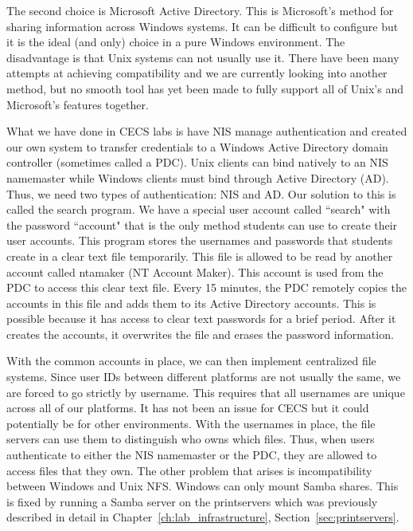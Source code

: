 The second choice is Microsoft Active Directory.  This is Microsoft's method for sharing information across Windows systems.  It can be difficult to configure but it is the ideal (and only) choice in a pure Windows environment.  The disadvantage is that Unix systems can not usually use it.  There have been many attempts at achieving compatibility and we are currently looking into another method, but no smooth tool has yet been made to fully support all of Unix's and Microsoft's features together.  

What we have done in CECS labs is have NIS manage authentication and created our own system to transfer credentials to a Windows Active Directory domain controller (sometimes called a PDC).  Unix clients can bind natively to an NIS namemaster while Windows clients must bind through Active Directory (AD).  Thus, we need two types of authentication: NIS and AD.  Our solution to this is called the search program.  We have a special user account called ``search" with the password ``account" that is the only method students can use to create their user accounts.  This program stores the usernames and passwords that students create in a clear text file temporarily.  This file is allowed to be read by another account called ntamaker (NT Account Maker).  This account is used from the PDC to access this clear text file.  Every 15 minutes, the PDC remotely copies the accounts in this file and adds them to its Active Directory accounts.  This is possible because it has access to clear text passwords for a brief period.  After it creates the accounts, it overwrites the file and erases the password information.

With the common accounts in place, we can then implement centralized file systems.  Since user IDs between different platforms are not usually the same, we are forced to go strictly by username.  This requires that all usernames are unique across all of our platforms.  It has not been an issue for CECS but it could potentially be for other environments.  With the usernames in place, the file servers can use them to distinguish who owns which files.  Thus, when users authenticate to either the NIS namemaster or the PDC, they are allowed to access files that they own.  The other problem that arises is incompatibility between Windows and Unix NFS.  Windows can only mount Samba shares.  This is fixed by running a Samba server on the printservers which was previously described in detail in Chapter~\ref{ch:lab_infrastructure}, Section~\ref{sec:printservers}.  

